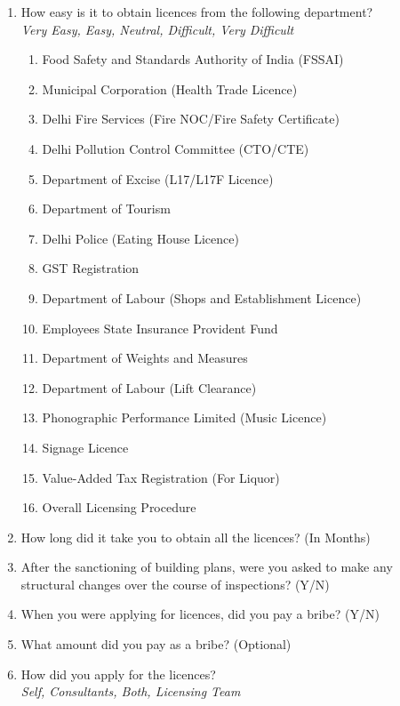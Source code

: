 \documentclass[a4paper, 12pt]{article}
\begin{document}
		\begin {enumerate}[nosep]
		\item How easy is it to obtain licences from the following department?\\ 
		\textit{Very Easy, Easy, Neutral, Difficult, Very Difficult}
			\begin {enumerate}[nosep]
			\item Food Safety and Standards Authority of India (FSSAI)
			\item Municipal Corporation (Health Trade Licence)
			\item Delhi Fire Services (Fire NOC/Fire Safety Certificate)
			\item Delhi Pollution Control Committee (CTO/CTE)
			\item Department of Excise (L17/L17F Licence)
			\item Department of Tourism
			\item Delhi Police (Eating House Licence)
			\item GST Registration
			\item Department of Labour (Shops and Establishment Licence)
			\item Employees State Insurance Provident Fund
			\item Department of Weights and Measures
			\item Department of Labour (Lift Clearance)
			\item Phonographic Performance Limited (Music Licence)
			\item Signage Licence
			\item Value-Added Tax Registration (For Liquor)
			\item Overall Licensing Procedure
			\end {enumerate}
		\item How long did it take you to obtain all the licences? (In Months)
		\item After the sanctioning of building plans, were you asked to make any structural changes over the course of inspections? (Y/N)
		\item When you were applying for licences, did you pay a bribe? (Y/N)
		\item What amount did you pay as a bribe? (Optional)
		\item How did you apply for the licences?\\
		\textit{Self, Consultants, Both, Licensing Team}
		\end {enumerate}
\end{document}

